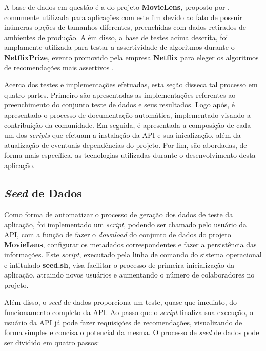 A base de dados em questão é a do projeto \textbf{MovieLens}, proposto por , comumente utilizada para aplicações com este fim devido ao fato de possuir inúmeras opções de tamanhos diferentes, preenchidas com dados retirados de ambientes de produção. Além disso, a base de testes acima descrita, foi amplamente utilizada para testar a assertividade de algoritmos durante o \textbf{NetflixPrize}, evento promovido pela empresa \textbf{Netflix} para eleger os algoritmos de recomendações mais assertivos \cite{bennett2007netflix}.

Acerca dos testes e implementações efetuadas, esta seção disseca tal processo em quatro partes. Primeiro são apresentadas as implementações referentes ao preenchimento do conjunto teste de dados e seus resultados. Logo após, é apresentado o processo de documentação automática, implementado visando a contribuição da comunidade. Em seguida, é apresentada a composição de cada um dos \textit{scripts} que efetuam a instalação da API e sua inicalização, além da atualização de eventuais dependências do projeto. Por fim, são abordadas, de forma mais específica, as tecnologias utilizadas durante o desenvolvimento desta aplicação.

\subsection{\textit{Seed} de Dados} \label{seed}

Como forma de automatizar o processo de geração dos dados de teste da aplicação, foi implementado um \textit{script}, podendo ser chamado pelo usuário da API, com a função de fazer o \textit{download} do conjunto de dados do projeto \textbf{MovieLens}, configurar os metadados correspondentes e fazer a persistência das informações. Este \textit{script}, executado pela linha de comando do sistema operacional e intitulado \textbf{seed.sh}, visa facilitar o processo de primeira inicialização da aplicação, atraindo novos usuários e aumentando o número de colaboradores no projeto.

Além disso, o \textit{seed} de dados proporciona um teste, quase que imediato, do funcionamento completo da API. Ao passo que o \textit{script} finaliza sua execução, o usuário da API já pode fazer requisições de recomendações, visualizando de forma simples e concisa o potencial da mesma. O processo de \textit{seed} de dados pode ser dividido em quatro passos:

